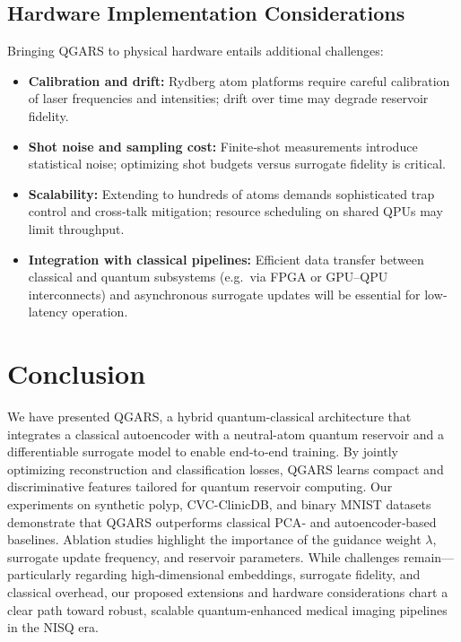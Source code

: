 \documentclass[conference]{IEEEtran}
\begin{document}
\subsection{Hardware Implementation Considerations}
Bringing QGARS to physical hardware entails additional challenges:
\begin{itemize}
    \item \textbf{Calibration and drift:}  
        Rydberg atom platforms require careful calibration of laser frequencies and intensities; drift over time may degrade reservoir fidelity.
    \item \textbf{Shot noise and sampling cost:}  
        Finite‐shot measurements introduce statistical noise; optimizing shot budgets versus surrogate fidelity is critical.
    \item \textbf{Scalability:}  
        Extending to hundreds of atoms demands sophisticated trap control and cross‐talk mitigation; resource scheduling on shared QPUs may limit throughput.
    \item \textbf{Integration with classical pipelines:}  
        Efficient data transfer between classical and quantum subsystems (e.g.\ via FPGA or GPU–QPU interconnects) and asynchronous surrogate updates will be essential for low‐latency operation.
\end{itemize}

\section{Conclusion}

We have presented QGARS, a hybrid quantum-classical architecture that integrates a classical autoencoder with a neutral-atom quantum reservoir and a differentiable surrogate model to enable end‐to‐end training. By jointly optimizing reconstruction and classification losses, QGARS learns compact and discriminative features tailored for quantum reservoir computing. Our experiments on synthetic polyp, CVC-ClinicDB, and binary MNIST datasets demonstrate that QGARS outperforms classical PCA‐ and autoencoder‐based baselines. Ablation studies highlight the importance of the guidance weight \(\lambda\), surrogate update frequency, and reservoir parameters. While challenges remain—particularly regarding high‐dimensional embeddings, surrogate fidelity, and classical overhead, our proposed extensions and hardware considerations chart a clear path toward robust, scalable quantum‐enhanced medical imaging pipelines in the NISQ era.




\end{document}
